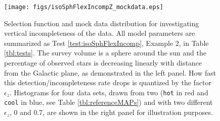 \begin{figure}
\centering
\texttt{[image: figs/isoSphFlexIncompZ\_mockdata.eps]}
\caption{Selection function and mock data distribution for investigating vertical incompleteness of the data. All model parameters are summarized as Test \ref{test:isoSphFlexIncomp}, Example 2, in Table \ref{tbl:tests}. The survey volume is a sphere around the sun and the percentage of observed stars is decreasing linearly with distance from the Galactic plane, as demonstrated in the left panel. How fast this detection/incompleteness rate drops is quantized by the factor $\epsilon_z$. Histograms for four data sets, drawn from two \MAPs{} (\texttt{hot} in red and \texttt{cool} in blue, see Table \ref{tbl:referenceMAPs}) and with two different $\epsilon_z$, 0 and 0.7, are shown in the right panel for illustration purposes. } 
\label{fig:isoSphFlexIncompZ_mockdata}
\end{figure}


